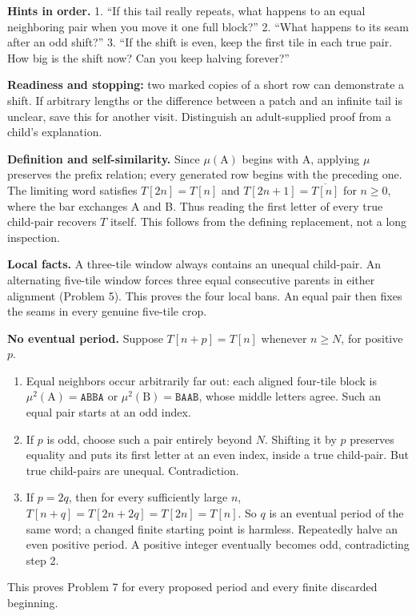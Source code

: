 \documentclass[11pt,letterpaper]{article}
\newcommand{\head}[1]{\par\vspace{5pt}{\large\bfseries #1}\par\nopagebreak\vspace{1pt}}
\newcommand{\word}[1]{\texttt{#1}}
\newcommand{\hint}[1]{\textbf{Hints in order.} #1}
\newcommand{\A}{\mathrm{A}}
\newcommand{\B}{\mathrm{B}}
\begin{document}
\hint{1. ``If this tail really repeats, what happens to an equal neighboring pair when you move it one full block?'' 2. ``What happens to its seam after an odd shift?'' 3. ``If the shift is even, keep the first tile in each true pair. How big is the shift now? Can you keep halving forever?''}

\textbf{Readiness and stopping:} two marked copies of a short row can demonstrate a shift. If arbitrary lengths or the difference between a patch and an infinite tail is unclear, save this for another visit. Distinguish an adult-supplied proof from a child's explanation.

\head{Mathematics behind the week}
\textbf{Definition and self-similarity.} Since $\mu(\A)$ begins with A, applying $\mu$ preserves the prefix relation; every generated row begins with the preceding one. The limiting word satisfies $T[2n]=T[n]$ and $T[2n+1]=\overline{T[n]}$ for $n\geq0$, where the bar exchanges A and B. Thus reading the first letter of every true child-pair recovers $T$ itself. This follows from the defining replacement, not a long inspection.

\textbf{Local facts.} A three-tile window always contains an unequal child-pair. An alternating five-tile window forces three equal consecutive parents in either alignment (Problem 5). This proves the four local bans. An equal pair then fixes the seams in every genuine five-tile crop.

\textbf{No eventual period.} Suppose $T[n+p]=T[n]$ whenever $n\geq N$, for positive $p$.
\begin{enumerate}
\item Equal neighbors occur arbitrarily far out: each aligned four-tile block is $\mu^2(\A)=\word{ABBA}$ or $\mu^2(\B)=\word{BAAB}$, whose middle letters agree. Such an equal pair starts at an odd index.
\item If $p$ is odd, choose such a pair entirely beyond $N$. Shifting it by $p$ preserves equality and puts its first letter at an even index, inside a true child-pair. But true child-pairs are unequal. Contradiction.
\item If $p=2q$, then for every sufficiently large $n$,
$T[n+q]=T[2n+2q]=T[2n]=T[n]$.
So $q$ is an eventual period of the same word; a changed finite starting point is harmless. Repeatedly halve an even positive period. A positive integer eventually becomes odd, contradicting step 2.
\end{enumerate}
This proves Problem 7 for every proposed period and every finite discarded beginning.
\end{document}

